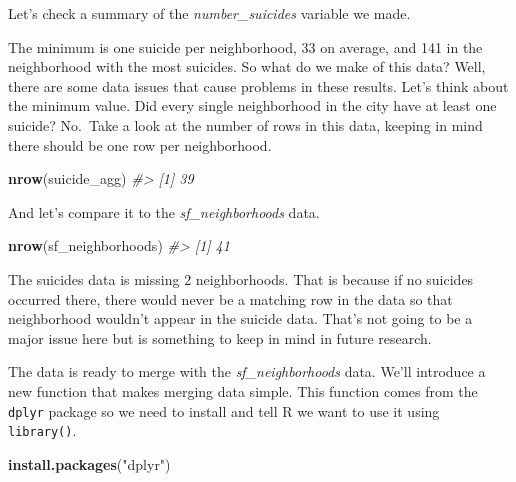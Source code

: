 \documentclass[
  12pt,
]{book}
\newenvironment{Shaded}{\begin{snugshade}}{\end{snugshade}}
\newcommand{\CommentTok}[1]{\textcolor[rgb]{0.37,0.37,0.37}{\textit{#1}}}
\newcommand{\KeywordTok}[1]{\textcolor[rgb]{0.27,0.27,0.27}{\textbf{#1}}}
\newcommand{\NormalTok}[1]{#1}
\newcommand{\OperatorTok}[1]{\textcolor[rgb]{0.43,0.43,0.43}{\textbf{#1}}}
\newcommand{\StringTok}[1]{\textcolor[rgb]{0.5,0.5,0.5}{#1}}
\begin{document}
Let's check a summary of the \emph{number\_suicides} variable we made.

\begin{Shaded}
\end{Shaded}

The minimum is one suicide per neighborhood, 33 on average, and 141 in the neighborhood with the most suicides. So what do we make of this data? Well, there are some data issues that cause problems in these results. Let's think about the minimum value. Did every single neighborhood in the city have at least one suicide? No.~Take a look at the number of rows in this data, keeping in mind there should be one row per neighborhood.

\begin{Shaded}
\begin{Highlighting}[]
\KeywordTok{nrow}\NormalTok{(suicide\_agg)}
\CommentTok{\#\textgreater{} [1] 39}
\end{Highlighting}
\end{Shaded}

And let's compare it to the \emph{sf\_neighborhoods} data.

\begin{Shaded}
\begin{Highlighting}[]
\KeywordTok{nrow}\NormalTok{(sf\_neighborhoods)}
\CommentTok{\#\textgreater{} [1] 41}
\end{Highlighting}
\end{Shaded}

The suicides data is missing 2 neighborhoods. That is because if no suicides occurred there, there would never be a matching row in the data so that neighborhood wouldn't appear in the suicide data. That's not going to be a major issue here but is something to keep in mind in future research.

The data is ready to merge with the \emph{sf\_neighborhoods} data. We'll introduce a new function that makes merging data simple. This function comes from the \texttt{dplyr} package so we need to install and tell R we want to use it using \texttt{library()}.

\begin{Shaded}
\begin{Highlighting}[]
\KeywordTok{install.packages}\NormalTok{(}\StringTok{"dplyr"}\NormalTok{)}
\end{Highlighting}
\end{Shaded}
\end{document}
